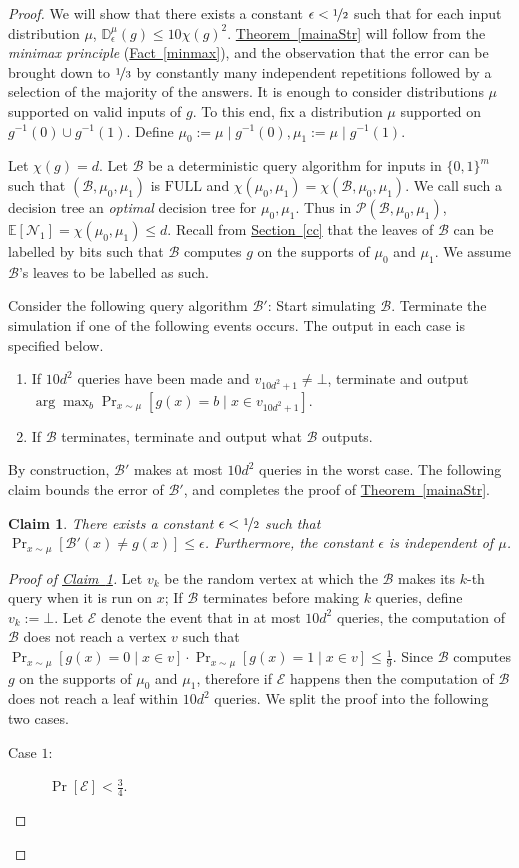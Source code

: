 \documentclass[11pt]{article}
\numberwithin{equation}{section}
\newtheorem{claim}[theorem]{Claim}
\theoremstyle{definition}
\theoremstyle{plain}
\newcommand{\expref}[2]{\hyperref[#2]{#1~\ref{#2}}}
\newcommand{\dr}{\nicefrac}
\newcommand{\eps}{\epsilon}
\newcommand{\D}{\mathbb{D}}
\newcommand{\full}{\text{FULL}}
\newcommand{\clB}{\mathcal{B}}
\newcommand{\clE}{\mathcal{E}}
\newcommand{\clP}{\mathcal{P}}
\newcommand{\clN}{\mathcal{N}}
\newcommand{\E}{\mathbb{E}}
\begin{document}
\begin{proof}
\label{hibias}
We will show that there exists a constant $\eps < \dr12$ such that for each input distribution $\mu$, $\D_{\eps}^\mu (g)  \leq 10\chi(g)^2$. \expref{Theorem}{mainaStr} will follow from the \emph{minimax principle} (\expref{Fact}{minmax}), and the observation that the error can be brought down to $\dr13$ by constantly many independent repetitions followed by a selection of the majority of the answers. It is enough to consider distributions $\mu$ supported on valid inputs of $g$. To this end, fix a distribution $\mu$ supported on $g^{-1}(0) \cup g^{-1}(1)$. Define $\mu_0:=\mu \mid g^{-1}(0), \mu_1:=\mu \mid g^{-1}(1)$.

Let $\chi(g)=d$. Let $\clB$ be a deterministic query algorithm for inputs in $\{0,1\}^m$ such that $(\clB, \mu_0, \mu_1)$ is $\full$ and $\chi(\mu_0, \mu_1)=\chi(\clB, \mu_0, \mu_1)$. We call such a decision tree an \emph{optimal} decision tree for $\mu_0, \mu_1$. Thus in $\clP(\clB, \mu_0, \mu_1)$, $\E[\clN_1] = \chi(\mu_0, \mu_1) \leq d$. Recall from \expref{Section}{cc} that the leaves of $\clB$ can be labelled by bits such that $\clB$ computes $g$ on the supports of $\mu_0$ and $\mu_1$. We assume $\clB$'s leaves to be labelled as such.

Consider the following query algorithm $\clB'$: Start simulating $\clB$. Terminate the simulation if one of the following events occurs. The output in each case is specified below.
\begin{enumerate}
\item If $10d^2$ queries have been made and $v_{10d^2+1}\neq \bot$, terminate and output $\arg \max_b \Pr_{x \sim \mu}[g(x)=b \mid x \in v_{10d^2+1}]$. \label{e2}
\item If $\clB$ terminates, terminate and output what $\clB$ outputs. \label{e1}
\end{enumerate}
By construction, $\clB'$ makes at most $10d^2$ queries in the worst case. The following claim bounds the error of $\clB'$, and completes the proof of \expref{Theorem}{mainaStr}.
\begin{claim}
\label{runtime}
There exists a constant $\eps < \dr12$ such that $\Pr_{x \sim \mu}[\clB'(x)\neq g(x)] \leq \eps$. Furthermore, the constant $\eps$ is independent of $\mu$.
\end{claim}
\begin{proof}[Proof of {\expref{Claim}{runtime}}]
Let $v_k$ be the random vertex at which the $\clB$ makes its $k$-th query when it is run on $x$; If $\clB$ terminates before making $k$ queries, define $v_k:=\bot$. Let $\clE$ denote the event that in at most $10d^2$ queries, the computation of $\clB$ does not reach a vertex $v$ such that $\Pr_{x \sim \mu}[g(x)=0 \mid x \in v]\cdot\Pr_{x \sim \mu}[g(x)=1 \mid x \in v] \leq \frac{1}{9}$. Since $\clB$ computes $g$ on the supports of $\mu_0$ and $\mu_1$, therefore if $\clE$ happens then the computation of $\clB$ does not reach a leaf within $10d^2$ queries. We split the proof into the following two cases.
\begin{description}
\item [Case $1$:] $\Pr[\clE] < \frac{3}{4}$.


\end{description}
\end{proof}
\end{proof}
\end{document}
